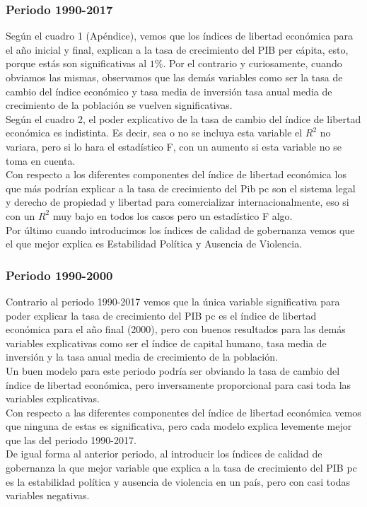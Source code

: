 	    \subsubsection*{Periodo 1990-2017}

		Según el cuadro 1 (Apéndice), vemos que los índices de libertad económica para el año inicial y final, explican a la tasa de crecimiento del PIB per cápita, esto, porque estás son significativas al $1\%$. Por el contrario y curiosamente, cuando obviamos las mismas, observamos que las demás variables como ser la tasa de cambio del índice económico y tasa media de inversión tasa anual media de crecimiento de la población se vuelven significativas.\\
		Según el cuadro 2, el poder explicativo de la tasa de cambio del índice de libertad económica es indistinta. Es decir, sea o no se incluya esta variable el $R^2$ no variara, pero si lo hara el estadístico F, con un aumento si esta variable no se toma en cuenta.\\  
		Con respecto a los diferentes componentes del índice de libertad económica los que más podrían explicar a la tasa de crecimiento del Pib pc son el sistema legal y derecho de propiedad y libertad para comercializar internacionalmente, eso si con un $R^2$ muy bajo en todos los casos pero un estadístico F algo.\\
		Por último cuando introducimos los índices de calidad de gobernanza vemos que el que mejor explica es Estabilidad Política y Ausencia de Violencia. 

	    \subsubsection*{Periodo 1990-2000}

		Contrario al periodo 1990-2017 vemos que la única variable significativa para poder explicar la tasa de crecimiento del PIB pc es el índice de libertad económica para el año final (2000), pero con buenos resultados para las demás variables explicativas como ser el índice de capital humano, tasa media de inversión y la tasa anual media de crecimiento de la población.\\
		Un buen modelo para este periodo podría ser obviando la tasa de cambio del índice de libertad económica, pero inversamente proporcional para casi toda las variables explicativas.\\
		Con respecto a las diferentes componentes del índice de libertad económica vemos que ninguna de estas es significativa, pero cada modelo explica levemente mejor que las del periodo 1990-2017.\\
		De igual forma al anterior periodo, al introducir los índices de calidad de gobernanza la que mejor variable que explica a la tasa de crecimiento del PIB pc es la estabilidad política y ausencia de violencia en un país, pero con casi todas variables negativas.\\


